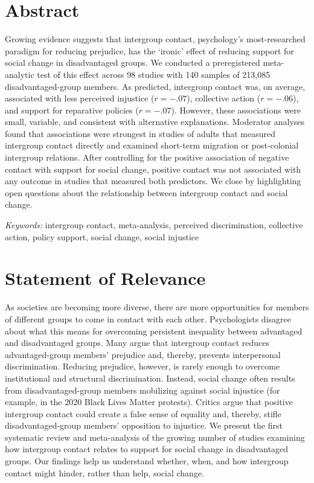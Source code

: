 \documentclass[12pt, letterpaper]{article}
\begin{document}
\section{Abstract}

\noindent Growing evidence suggests that intergroup contact, psychology's
most-researched paradigm for reducing prejudice, has the `ironic' effect
of reducing support for social change in disadvantaged groups. We
conducted a preregistered meta-analytic test of this effect across 98
studies with 140 samples of 213,085 disadvantaged-group members. As
predicted, intergroup contact was, on average, associated with less
perceived injustice (\(r = -.07\)), collective action (\(r = -.06\)),
and support for reparative policies (\(r = -.07\)). However, these
associations were small, variable, and consistent with alternative
explanations. Moderator analyses found that associations were strongest
in studies of adults that measured intergroup contact directly and
examined short-term migration or post-colonial intergroup relations.
After controlling for the positive association of negative contact with
support for social change, positive contact was not associated with any
outcome in studies that measured both predictors. We close by
highlighting open questions about the relationship between intergroup
contact and social change.

\textit{Keywords:} intergroup contact, meta-analysis, perceived discrimination, collective
action, policy support, social change, social injustice

\newpage

\section{Statement of Relevance}

\noindent As societies are becoming more diverse, there are more opportunities for
members of different groups to come in contact with each other.
Psychologists disagree about what this means for overcoming persistent
inequality between advantaged and disadvantaged groups. Many argue that
intergroup contact reduces advantaged-group members' prejudice and,
thereby, prevents interpersonal discrimination. Reducing prejudice,
however, is rarely enough to overcome institutional and structural
discrimination. Instead, social change often results from
disadvantaged-group members mobilizing against social injustice (for
example, in the 2020 Black Lives Matter protests). Critics argue that
positive intergroup contact could create a false sense of equality and,
thereby, stifle disadvantaged-group members' opposition to injustice. We
present the first systematic review and meta-analysis of the growing
number of studies examining how intergroup contact relates to support
for social change in disadvantaged groups. Our findings help us
understand whether, when, and how intergroup contact might hinder,
rather than help, social change.
\end{document}
